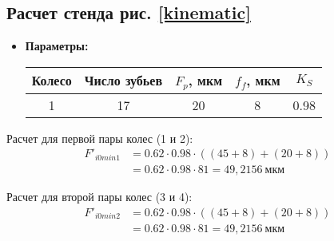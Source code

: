 
\subsection{Расчет стенда рис. \ref{kinematic}}
\begin{itemize}
    \item \textbf{Параметры:}
        \begin{tabular}{|c|c|c|c|c|}
            \hline
            Колесо & Число зубьев & \( F_p \), мкм & \( f_f \), мкм & \( K_S \) \\ \hline
            1 & 17 & 20 & 8 & 0.98 \\ \hline
        \end{tabular}
\end{itemize}


\noindent Расчет для первой пары колес (1 и 2):
\begin{align*}
F'_{i0min1} &= 0.62 \cdot 0.98 \cdot ((45 + 8) + (20 + 8)) \\
&= 0.62 \cdot 0.98 \cdot 81 = 49,\!2156\ \text{мкм}
\end{align*}

\noindent Расчет для второй пары колес (3 и 4):
\begin{align*}
F'_{i0min2} &= 0.62 \cdot 0.98 \cdot ((45 + 8) + (20 + 8)) \\
&= 0.62 \cdot 0.98 \cdot 81 = 49,\!2156\ \text{мкм}
\end{align*}

